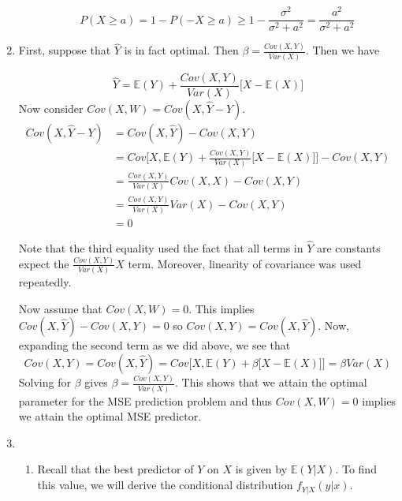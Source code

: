 \documentclass[12pt]{article}  %
\newcommand{\E}{{\mathbb{E}}}
\begin{document}
\begin{enumerate}
\begin{enumerate}
$$P(X\geq a) = 1 - P(-X\geq a)\geq 1 - \frac{\sigma^2}{\sigma^2 + a^2} = \frac{a^2}{\sigma^2 + a^2}$$
\end{enumerate}


\item First, suppose that $\hat{Y}$ is in fact optimal. Then $\beta = \frac{Cov(X,Y)}{Var(X)}$. Then we have 

$$\widehat{Y} = \E(Y) + \frac{Cov(X,Y)}{Var(X)}\Big[X-\E(X)\Big]$$ Now consider $Cov(X,W) = Cov(X,\hat{Y}-Y)$. \begin{align*}
Cov(X,\hat{Y}-Y) &= Cov(X,\hat{Y}) - Cov(X,Y)\\
&= Cov\Big[X, \E(Y) + \frac{Cov(X,Y)}{Var(X)}\big[X-\E(X)\big]\Big] - Cov(X,Y)\\
&= \frac{Cov(X,Y)}{Var(X)}Cov(X,X) - Cov(X,Y)\\
&= \frac{Cov(X,Y)}{Var(X)}Var(X) - Cov(X,Y)\\
&= 0
\end{align*}

Note that the third equality used the fact that all terms in $\hat{Y}$ are constants expect the $\frac{Cov(X,Y)}{Var(X)} X$ term. Moreover, linearity of covariance was used repeatedly. 

Now assume that $Cov(X,W) = 0$. This implies $Cov(X,\hat{Y}) - Cov(X,Y) = 0$ so $Cov(X,Y) = Cov(X,\hat{Y})$. Now, expanding the second term as we did above, we see that $$Cov(X,Y) = Cov(X,\hat{Y}) = Cov\Big[X, \E(Y) + \beta\big[X-\E(X)\big]\Big] = \beta Var(X)$$ Solving for $\beta$ gives $\beta = \frac{Cov(X,Y)}{Var(X)}$. This shows that we attain the optimal parameter for the MSE prediction problem and thus $Cov(X,W) = 0$ implies we attain the optimal MSE predictor. 

\item 

\begin{enumerate}
\item Recall that the best predictor of $Y$ on $X$ is given by $\E(Y|X)$. To find this value, we will derive the conditional distribution $f_{Y|X}(y|x)$. 



\end{enumerate}
\end{enumerate}
\end{document}
